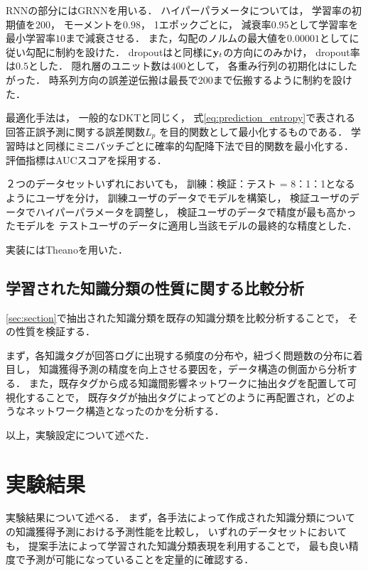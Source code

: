 RNNの部分にはGRNNを用いる．
ハイパーパラメータについては，
学習率の初期値を$200$，
モーメントを$0.98$，
1エポックごとに，
減衰率$0.95$として学習率を最小学習率$10$まで減衰させる．
また，勾配のノルムの最大値を$0.00001$として\cite{pascanu2013difficulty}に従い勾配に制約を設けた．
dropoutは\cite{piech2015deep}と同様に${\bf y}_t$の方向にのみかけ，
dropout率は$0.5$とした．
隠れ層のユニット数は$400$として，
各重み行列の初期化は\cite{glorot2010understanding}にしたがった．
時系列方向の誤差逆伝搬は最長で$200$まで伝搬するように制約を設けた．

最適化手法は，
一般的なDKTと同じく，
式\ref{eq:prediction_entropy}で表される回答正誤予測に関する誤差関数$L_p$
を目的関数として最小化するものである．
学習時は\cite{piech2015deep}と同様にミニバッチごとに確率的勾配降下法で目的関数を最小化する．
評価指標はAUCスコアを採用する．

２つのデータセットいずれにおいても，
訓練：検証：テスト = 8：1：1となるようにユーザを分け，
訓練ユーザのデータでモデルを構築し，
検証ユーザのデータでハイパーパラメータを調整し， 
検証ユーザのデータで精度が最も高かったモデルを
テストユーザのデータに適用し当該モデルの最終的な精度とした．

実装にはTheanoを用いた．


\subsection{学習された知識分類の性質に関する比較分析}

\ref{sec:section}で抽出された知識分類を既存の知識分類を比較分析することで，
その性質を検証する．

まず，各知識タグが回答ログに出現する頻度の分布や，紐づく問題数の分布に着目し，
知識獲得予測の精度を向上させる要因を，データ構造の側面から分析する．
また，既存タグから成る知識間影響ネットワークに抽出タグを配置して可視化することで，
既存タグが抽出タグによってどのように再配置され，どのようなネットワーク構造となったのかを分析する．




以上，実験設定について述べた．



\section{実験結果}
実験結果について述べる．
まず，各手法によって作成された知識分類についての知識獲得予測における予測性能を比較し，
いずれのデータセットにおいても，
提案手法によって学習された知識分類表現を利用することで，
最も良い精度で予測が可能になっていることを定量的に確認する．

